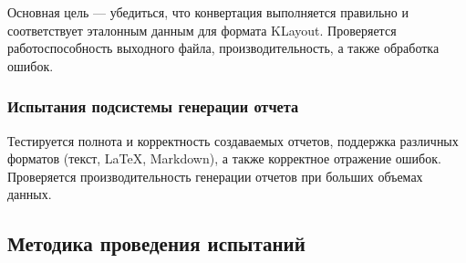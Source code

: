 Основная цель --- убедиться, что конвертация выполняется правильно
и соответствует эталонным данным для формата KLayout.
Проверяется работоспособность выходного файла,
производительность, а также обработка ошибок.

\subsubsection{Испытания подсистемы генерации отчета}

Тестируется полнота и корректность создаваемых отчетов,
поддержка различных форматов (текст, LaTeX, Markdown),
а также корректное отражение ошибок.
Проверяется производительность генерации отчетов при больших объемах данных.

\subsection{Методика проведения испытаний}

